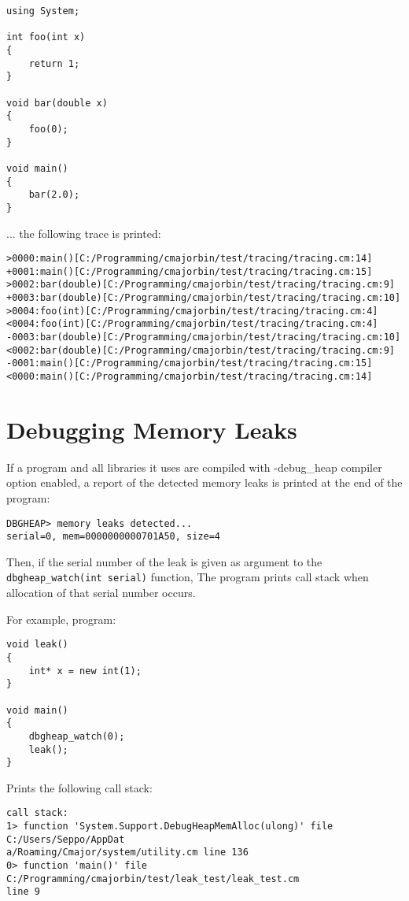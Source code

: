 \documentclass[oneside, a4paper, 11pt]{article}
\begin{document}
\begin{verbatim}
using System;

int foo(int x)
{
    return 1;
}

void bar(double x)
{
    foo(0);
}

void main()
{
    bar(2.0);
}
\end{verbatim}

... the following trace is printed:

\begin{verbatim}
>0000:main()[C:/Programming/cmajorbin/test/tracing/tracing.cm:14]
+0001:main()[C:/Programming/cmajorbin/test/tracing/tracing.cm:15]
>0002:bar(double)[C:/Programming/cmajorbin/test/tracing/tracing.cm:9]
+0003:bar(double)[C:/Programming/cmajorbin/test/tracing/tracing.cm:10]
>0004:foo(int)[C:/Programming/cmajorbin/test/tracing/tracing.cm:4]
<0004:foo(int)[C:/Programming/cmajorbin/test/tracing/tracing.cm:4]
-0003:bar(double)[C:/Programming/cmajorbin/test/tracing/tracing.cm:10]
<0002:bar(double)[C:/Programming/cmajorbin/test/tracing/tracing.cm:9]
-0001:main()[C:/Programming/cmajorbin/test/tracing/tracing.cm:15]
<0000:main()[C:/Programming/cmajorbin/test/tracing/tracing.cm:14]
\end{verbatim}

\section{Debugging Memory Leaks}

If a program and all libraries it uses are compiled with -debug\_heap compiler option enabled,
a report of the detected memory leaks is printed at the end of the program:

\begin{verbatim}
DBGHEAP> memory leaks detected...
serial=0, mem=0000000000701A50, size=4
\end{verbatim}

Then, if the serial number of the leak is given as argument to the \verb|dbgheap_watch(int serial)| function,
The program prints call stack when allocation of that serial number occurs.

For example, program:

\begin{verbatim}
void leak()
{
    int* x = new int(1);
}

void main()
{
    dbgheap_watch(0);
    leak();
}
\end{verbatim}

Prints the following call stack:

\begin{verbatim}
call stack:
1> function 'System.Support.DebugHeapMemAlloc(ulong)' file C:/Users/Seppo/AppDat
a/Roaming/Cmajor/system/utility.cm line 136
0> function 'main()' file C:/Programming/cmajorbin/test/leak_test/leak_test.cm
line 9
\end{verbatim}
\end{document}
